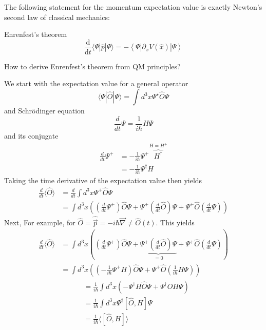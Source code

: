The following statement for the momentum expectation value is exactly Newton’s second law of classical mechanics:
\begin{qt}
Enrenfest's theorem
\begin{equation}
\frac{\mathrm{d}}{\mathrm{d} t}\langle\Psi|\hat{p}| \Psi\rangle=-\left\langle\Psi\left|\partial_{x} V(\hat{x})\right| \Psi\right\rangle
\end{equation}
\end{qt}
\begin{mybox}
\begin{center}
    How to derive Enrenfest's theorem from QM principles?
\end{center}
\end{mybox}
\begin{mybox2}
We start with the expectation value for a general operator
$$
\langle\Psi|\hat{O}| \Psi\rangle=\int d^{3} x \Psi^{\star}\hat{O} \Psi
$$
and Schrödinger equation
$$
\frac{d}{d t} \Psi=\frac{1}{i \hbar} H \Psi
$$
and its conjugate
$$
\begin{aligned}
\frac{d}{d t} \Psi^{+} &=-\frac{1}{i \hbar} \Psi^{+} \overbrace{H^{\dagger}}^{H=H^+} \\
&=-\frac{1}{i \hbar} \Psi^{\dagger} H
\end{aligned}
$$
Taking the time derivative of the expectation value then yields
$$
\begin{aligned}
\frac{d}{d t}\langle \hat{O}\rangle &=\frac{d}{d t} \int d^{3} x \Psi^{+} \hat{O} \Psi \\
&=\int d^{3} x\left(\left(\frac{d}{d t} \Psi^{+}\right) \hat{O} \Psi+\Psi^{+}\left(\frac{d}{d t} \hat{O}\right) \Psi+\Psi^{+} \hat{O}\left(\frac{d}{d t} \Psi\right)\right)
\end{aligned}
$$
Next,  For example, for $\hat{O}=\hat{\vec{p}}=-i \hbar \vec{\nabla} \neq \hat{O}(t) .$ This yields
$$
\begin{aligned}
\frac{d}{d t}\langle \hat{O}\rangle &=\int d^{3} x\left(\left(\frac{d}{d t} \Psi^{+}\right) \hat{O} \Psi+\underbrace{\Psi^{+}\left(\frac{d}{d t} \hat{O}\right) \Psi}_{=0}+\Psi^{+} \hat{O}\left(\frac{d}{d t} \Psi\right)\right) \\
&=\int d^{3} x\left(\left(-\frac{1}{i \hbar} \Psi^{+} H\right) \hat{O} \Psi+\Psi^{+} \hat{O}\left(\frac{1}{i \hbar} H \Psi\right)\right)
\end{aligned}
$$
$$
\begin{aligned}
&=\frac{1}{i \hbar} \int d^{3} x\left(-\Psi^{\dagger} H \hat{O} \Psi+\Psi^{\dagger} \hat{O} H \Psi\right)\\
&=\frac{1}{i \hbar} \int d^{3} x \Psi^{\dagger}[\hat{O}, H] \Psi\\
&=\frac{1}{i \hbar}\langle[\hat{O}, H]\rangle
\end{aligned}
$$
\end{mybox2}
